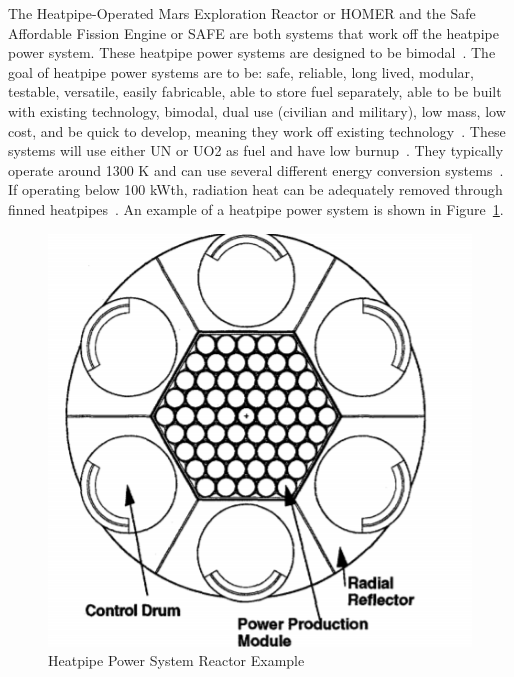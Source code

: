 \documentclass{article}
\begin{document}
The Heatpipe-Operated Mars Exploration Reactor or HOMER and the Safe Affordable Fission Engine or SAFE are both systems that work off the heatpipe power system. These heatpipe power systems are designed to be bimodal~\cite{houts1997heatpipe}. The goal of heatpipe power systems are to be: safe, reliable, long lived, modular, testable, versatile, easily fabricable, able to store fuel separately, able to be built with existing technology, bimodal, dual use (civilian and military), low mass, low cost, and be quick to develop, meaning they work off existing technology~\cite{houts1997heatpipe}. These systems will use either UN or UO2 as fuel and have low burnup~\cite{houts1997heatpipe}. They typically operate around 1300 K and can use several different energy conversion systems~\cite{houts1997heatpipe}. If operating below 100 kWth, radiation heat can be adequately removed through finned heatpipes~\cite{houts1997heatpipe}. An example of a heatpipe power system is shown in Figure~\ref{appP}. 


\begin{figure}[]
	\centering
	\includegraphics[height=0.45\textheight]{fig/appP}
	\caption[Heatpipe Power System Reactor Example]{Heatpipe Power System Reactor Example~\cite{poston2001heatpipe}}
	\label{appP}
\end{figure}
\end{document}
